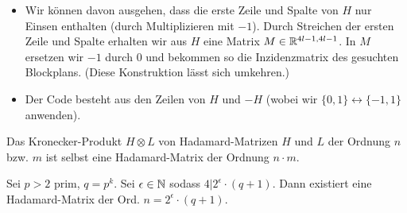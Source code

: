 \documentclass{cheat-sheet}
\newcommand{\divides}{|} %
\begin{document}
\begin{konstr}
  \begin{itemize}
    \item Wir können davon ausgehen, dass die erste Zeile und Spalte von $H$ nur Einsen enthalten (durch Multiplizieren mit $-1$).
    Durch Streichen der ersten Zeile und Spalte erhalten wir aus $H$ eine Matrix $M \in \mathbb{R}^{4l - 1, 4l - 1}$.
    In $M$ ersetzen wir $-1$ durch $0$ und bekommen so die Inzidenzmatrix des gesuchten Blockplans.
    (Diese Konstruktion lässt sich umkehren.)
    \item Der Code besteht aus den Zeilen von $H$ und $-H$ (wobei wir $\{ 0, 1 \} \leftrightarrow \{ -1, 1 \}$ anwenden).
  \end{itemize}
\end{konstr}

\begin{lem}
  Das Kronecker-Produkt $H \otimes L$ von Hadamard-Matrizen $H$ und $L$ der Ordnung $n$ bzw. $m$ ist selbst eine Hadamard-Matrix der Ordnung $n \cdot m$.
\end{lem}



\begin{satz}
  Sei $p > 2$ prim, $q = p^k$.
  Sei $\epsilon \in \mathbb{N}$ sodass $4 \divides 2^\epsilon \cdot (q + 1)$.
  Dann existiert eine Hadamard-Matrix der Ord. $n = 2^\epsilon \cdot (q+1)$.
\end{satz}
\end{document}
